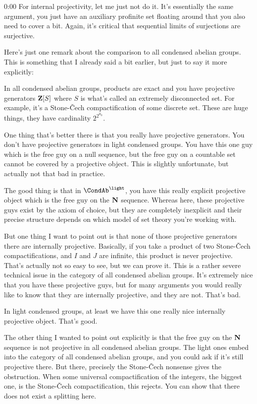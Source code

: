 \begin{unfinished}{0:00}
For internal projectivity, let me just not do it. It's essentially the same argument, you just have an auxiliary profinite set floating around that you also need to cover a bit. Again, it's critical that sequential limits of surjections are surjective.

Here's just one remark about the comparison to all condensed abelian groups. This is something that I already said a bit earlier, but just to say it more explicitly:

In all condensed abelian groups, products are exact and you have projective generators $\mathbf Z[S]$ where $S$ is what's called an extremely disconnected set. For example, it's a Stone-Čech compactification of some discrete set. These are huge things, they have cardinality $2^{2^{\aleph_0}}$.

One thing that's better there is that you really have projective generators. You don't have projective generators in light condensed groups. You have this one guy which is the free guy on a null sequence, but the free guy on a countable set cannot be covered by a projective object. This is slightly unfortunate, but actually not that bad in practice.

The good thing is that in $\CondAb^\light$, you have this really explicit projective object which is the free guy on the $\mathbf N$ sequence. Whereas here, these projective guys exist by the axiom of choice, but they are completely inexplicit and their precise structure depends on which model of set theory you're working with.

But one thing I want to point out is that none of those projective generators there are internally projective. Basically, if you take a product of two Stone-Čech compactifications, and $I$ and $J$ are infinite, this product is never projective. That's actually not so easy to see, but we can prove it. This is a rather severe technical issue in the category of all condensed abelian groups. It's extremely nice that you have these projective guys, but for many arguments you would really like to know that they are internally projective, and they are not. That's bad.

In light condensed groups, at least we have this one really nice internally projective object. That's good.

The other thing I wanted to point out explicitly is that the free guy on the $\mathbf N$ sequence is not projective in all condensed abelian groups. The light ones embed into the category of all condensed abelian groups, and you could ask if it's still projective there. But there, precisely the Stone-Čech nonsense gives the obstruction. When some universal compactification of the integers, the biggest one, is the Stone-Čech compactification, this rejects. You can show that there does not exist a splitting here.


\end{unfinished}
